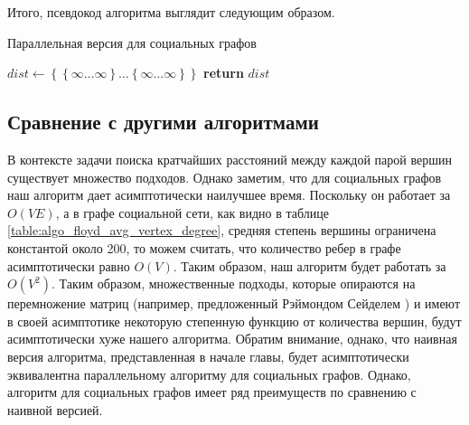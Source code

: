Итого, псевдокод алгоритма выглядит следующим образом.

\FloatBarrier
\begin{algorithm}
\caption{Параллельная версия для социальных графов}\label{all_pairs_social}
\begin{algorithmic}[1]

\State $dist\gets \left\{ {   \left\{ {\infty \ldots \infty}\right\}  \ldots \left\{ {\infty \ldots \infty}\right\} }\right\}$
 
\State \textbf{return} $dist$ 
\EndProcedure

\end{algorithmic}
\end{algorithm}


\FloatBarrier
\subsection{Сравнение с другими алгоритмами}

В контексте задачи поиска кратчайших расстояний между каждой парой вершин существует множество подходов. Однако заметим, что для социальных графов наш алгоритм дает асимптотически наилучшее время. Поскольку он работает за $O(VE)$, а в графе социальной сети, как видно в таблице \ref{table:algo_floyd_avg_vertex_degree}, средняя степень вершины ограничена константой около 200, то можем считать, что количество ребер в графе асимптотически равно $O(V)$. Таким образом, наш алгоритм будет работать за $O(V^2)$. Таким образом, множественные подходы, которые опираются на перемножение матриц (например, предложенный Рэймондом Сейделем \cite{SEIDEL}) и имеют в своей асимптотике некоторую степенную функцию от количества вершин, будут асимптотически хуже нашего алгоритма. Обратим внимание, однако, что наивная версия алгоритма, представленная в начале главы, будет асимптотически эквивалентна параллельному алгоритму для социальных графов. Однако, алгоритм для социальных графов имеет ряд преимуществ по сравнению с наивной версией. 



